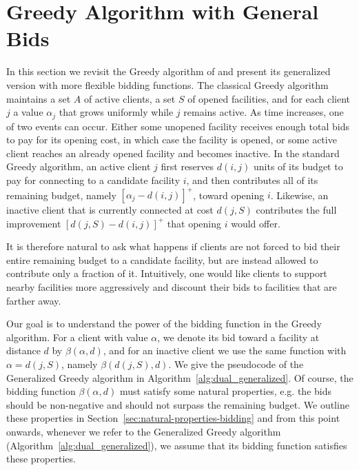 \section{Greedy Algorithm with General Bids}
\label{sec:greedy_algorithm_general_bids}

In this section we revisit the Greedy algorithm of \cite{JMS02, JainMMSV03} and present its generalized version with more flexible bidding functions. The classical Greedy algorithm maintains a set $A$ of active clients, a set $S$ of opened facilities, and for each client $j$ a value $\alpha_j$ that grows uniformly while $j$ remains active. As time increases, one of two events can occur. Either some unopened facility receives enough total bids to pay for its opening cost, in which case the facility is opened, or some active client reaches an already opened facility and becomes inactive. In the standard Greedy algorithm, an active client $j$ first reserves $d(i,j)$ units of its budget to pay for connecting to a candidate facility $i$, and then contributes all of its remaining budget, namely $[\alpha_j-d(i,j)]^+$, toward opening $i$. Likewise, an inactive client that is currently connected at cost $d(j,S)$ contributes the full improvement $[d(j,S)-d(i,j)]^+$ that opening $i$ would offer.

It is therefore natural to ask what happens if clients are not forced to bid their entire remaining budget to a candidate facility, but are instead allowed to contribute only a fraction of it.
Intuitively, one would like clients to support nearby facilities more aggressively and discount their bids to facilities that are farther away.

Our goal is to understand the power of the bidding function in the Greedy algorithm. For a client with value $\alpha$, we denote its bid toward a facility at distance $d$ by $\beta(\alpha,d)$, and for an inactive client we use the same function with $\alpha=d(j,S)$, namely $\beta(d(j,S),d)$. We give the pseudocode of the Generalized Greedy algorithm in Algorithm~\ref{alg:dual_generalized}. Of course, the bidding function $\beta(\alpha,d)$ must
satisfy some natural properties, e.g. the bids should be non-negative and should not surpass
the remaining budget. We outline these properties in Section~\ref{sec:natural-properties-bidding} and from this point onwards, whenever we refer to the Generalized Greedy algorithm (Algorithm~\ref{alg:dual_generalized}), we assume that its bidding function satisfies these properties.

